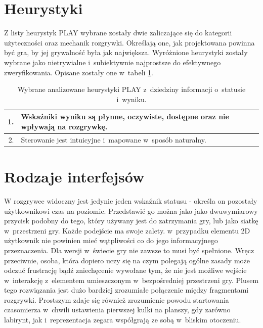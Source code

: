 \documentclass[a4paper,12pt,numbers=noenddot]{report}
\begin{document}
\section{Heurystyki}
Z listy heurystyk PLAY \cite{ArticlePLAY} wybrane zostały dwie zaliczające się do kategorii użyteczności oraz mechanik rozgrywki. Określają one, jak projektowana powinna być gra, by jej grywalność była jak największa. Wyróżnione heurystyki zostały wybrane jako nietrywialne i~subiektywnie najprostsze do efektywnego zweryfikowania. Opisane zostały one w~tabeli \ref{tab:tab1}.

\begin{table}[h!]
  \centering
  \caption{Wybrane analizowane heurystyki PLAY z~dziedziny informacji o~statusie i~wyniku.}
  \label{tab:tab1}
  \begin{tabular}{|r|l|}
    \hline
    1. & Wskaźniki wyniku są płynne, oczywiste, dostępne oraz nie wpływają na rozgrywkę.\\
    \hline
    2. & Sterowanie jest intuicyjne i~mapowane w~sposób naturalny.\\
    \hline
  \end{tabular}
\end{table}

\section{Rodzaje interfejsów}
W rozgrywce widoczny jest jedynie jeden wskaźnik statusu - określa on pozostały użytkownikowi czas na poziomie. Przedstawić go można jako jako dwuwymiarowy przycisk podobny do tego, który używany jest do zatrzymania gry, lub jako siatkę w~przestrzeni gry. Każde podejście ma swoje zalety. w~przypadku elementu 2D użytkownik nie powinien mieć wątpliwości co do jego informacyjnego przeznaczenia. Dla wersji w~świecie gry nie zawsze to musi być spełnione. Wręcz przeciwnie, osoba, która dopiero uczy się na czym polegają ogólne zasady może odczuć frustrację bądź zniechęcenie wywołane tym, że nie jest możliwe wejście w~interakcję z~elementem umieszczonym w~bezpośredniej przestrzeni gry. Plusem tego rozwiązania jest dużo bardziej zrozumiałe połączenie między fragmentami rozgrywki. Prostszym zdaje się również zrozumienie powodu startowania czasomierza w~chwili ustawienia pierwszej kulki na planszy, gdy zarówno labirynt, jak i~reprezentacja zegara współgrają ze sobą w~bliskim otoczeniu.
\end{document}
